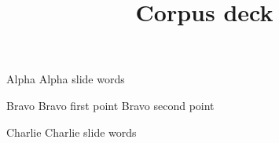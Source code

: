 \documentclass{beamer}
\title{Corpus deck}
\begin{document}
\begin{frame}{Alpha}
  Alpha slide words
\end{frame}
\begin{frame}{Bravo}
  Bravo first point \pause Bravo second point
\end{frame}
\begin{frame}{Charlie}
  Charlie slide words
\end{frame}
\end{document}
